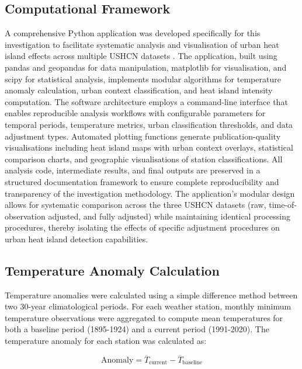 \documentclass[11pt, a4paper]{article}
\begin{document}
  \subsection{Computational Framework}

A comprehensive Python application was developed specifically for this investigation to facilitate systematic analysis and visualisation of urban heat island effects across multiple USHCN datasets \parencite{lyon2025ushcn}. The application, built using pandas and geopandas for data manipulation, matplotlib for visualisation, and scipy for statistical analysis, implements modular algorithms for temperature anomaly calculation, urban context classification, and heat island intensity computation. The software architecture employs a command-line interface that enables reproducible analysis workflows with configurable parameters for temporal periods, temperature metrics, urban classification thresholds, and data adjustment types. Automated plotting functions generate publication-quality visualisations including heat island maps with urban context overlays, statistical comparison charts, and geographic visualisations of station classifications. All analysis code, intermediate results, and final outputs are preserved in a structured documentation framework to ensure complete reproducibility and transparency of the investigation methodology. The application's modular design allows for systematic comparison across the three USHCN datasets (raw, time-of-observation adjusted, and fully adjusted) while maintaining identical processing procedures, thereby isolating the effects of specific adjustment procedures on urban heat island detection capabilities.

\subsection{Temperature Anomaly Calculation}

Temperature anomalies were calculated using a simple difference method between two 30-year climatological periods. For each weather station, monthly minimum temperature observations were aggregated to compute mean temperatures for both a baseline period (1895-1924) and a current period (1991-2020). The temperature anomaly for each station was calculated as: 

\begin{equation} \text{Anomaly} = \overline{T}_{\text{current}} - \overline{T}_{\text{baseline}} \end{equation}
\end{document}
